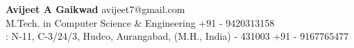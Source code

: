 %


\begin{minipage}{1\linewidth}
  	\textbf{Avijeet A Gaikwad} \vspace{0.1cm} \hfill
  	\Letter \space avijeet7@gmail.com \hspace{0.1cm} \\
  	M.Tech. in Computer Science \& Engineering \vspace{0.1cm} \hfill \phone \space +91 - 9420313158 \hspace{0.1cm} \\
  	\faHome : N-11, C-3/24/3, Hudco, Aurangabad, (M.H., India) - 431003 \hfill \phone \space +91 - 9167765477 \hspace{0.1cm} \\
\end{minipage}


